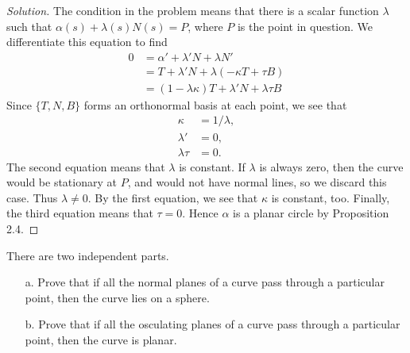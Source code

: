 \documentclass[Shifrin_Solutions_Spring_2018]{subfiles}
\begin{document}
\begin{proof}[Solution]
The condition in the problem means that there is a scalar function $\lambda$ such 
that $\alpha(s)  + \lambda(s)N(s) = P$, where $P$ is the point in question. We 
differentiate this equation to find
\[
\begin{split}
0 & = \alpha' + \lambda'N + \lambda N' \\
	& = T + \lambda' N + \lambda (-\kappa T +\tau B ) \\
	& = (1-\lambda\kappa) T + \lambda' N + \lambda\tau B
\end{split}
\]
Since $\{ T, N, B \}$ forms an orthonormal basis at each point, we see that
\begin{align*}
\kappa & = 1/\lambda , \\
\lambda' & = 0, \\
\lambda\tau & = 0 .
\end{align*}
The second equation means that $\lambda$ is constant. If $\lambda$ is always zero, 
then the curve would be stationary at $P$, and would not have normal lines, so we 
discard this case. Thus $\lambda \neq 0$. By the first equation, we see that $\kappa$ 
is constant, too. Finally, the third equation means that $\tau =0$. Hence $\alpha$ is a 
planar circle by Proposition 2.4.
\end{proof}

\clearpage


\begin{exercise}There are two independent parts.
\begin{itemize}
\item[a.] Prove that if all the normal planes of a curve pass through a particular 
point, then the curve lies on a sphere.
\item[b.] Prove that if all the osculating planes of a curve pass through a particular 
point, then the curve is planar.
\end{itemize}
\end{exercise}
\end{document}
